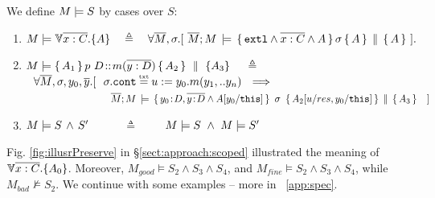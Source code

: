 \begin{definition}  
We define $M \models {S}$ by cases over $S$:  

\label{def:necessity-semantics}

\begin{enumerate}
 \item
\label{def:necessity-semantics-first}
 $\satisfies{M}{\TwoStatesN {\overline {x:C}} {A}} \ \  \ \triangleq   \ \ \ {\forall   \Mtwo,  \sigma.[\ {\satAssertQuadruple  \Mtwo  M    {\extThis \wedge \overline {x:C} \wedge A} \sigma {A} {A} }\ ].}$
  \item
   \label{def:necessity-semantics-second}
 $M \models   \{\, A_1\, \}\, p\ D\!::\!m(\overline{y:D})\, \{\, A_2\, \} \, \,\parallel\,\, \{ A_3 \}\  \ \ \   \triangleq  $ \\ %
$\strut \ \   \forall   \Mtwo,  \sigma, y_0,\overline y.[\ 
 \ \sigma.\prg{cont}\txteq {u:=y_0.m(y_1,..y_n)} \ \ \Longrightarrow \ \ $\\
$\strut  \ \ \   \ \ \ \ \ \ \ \ \   \ \ \  \ \ 
\ \ \ \ \ \ \ \ \ {\satAssertQuadruple  { \Mtwo} {M} { y_0\!:\!D, \overline {y\!:\!D}   \wedge   A[y_0/\prg{this}]}  {\ \sigma\ }   {A_2[u/res,y_0/\prg{this}] }{A_3 } } \  \ \  ]  $   
 \item
 $M \models S\, \wedge\, S'$\ \ \  \ \ \  $\triangleq$  \  \ \  \   $M \models S\ \wedge \ M \models S'$
\end{enumerate}
\end{definition}

Fig. \ref{fig:illusrPreserve} in  \S \ref{sect:approach:scoped}  illustrated  the meaning of ${\TwoStatesN {\overline {x:C}} {A_0}}$. 
Moreover, $M_{good} \models S_2 \wedge S_3 \wedge S_4$, and  $M_{fine} \models S_2 \wedge S_3 \wedge S_4$,
 while $M_{bad} \not\models S_2$.
We continue with some examples -- more in %
\A ~\ref{app:spec}.

